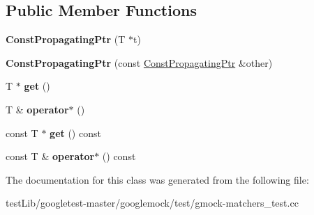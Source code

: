 \subsection*{Public Member Functions}
\begin{DoxyCompactItemize}
\item 
\mbox{\label{classtesting_1_1gmock__matchers__test_1_1ConstPropagatingPtr_a06da70663daa274fb8ca3352f039d609}} 
{\bfseries Const\+Propagating\+Ptr} (T $\ast$t)
\item 
\mbox{\label{classtesting_1_1gmock__matchers__test_1_1ConstPropagatingPtr_ae7620c62ba340603968896d5d5400ed1}} 
{\bfseries Const\+Propagating\+Ptr} (const \hyperlink{classtesting_1_1gmock__matchers__test_1_1ConstPropagatingPtr}{Const\+Propagating\+Ptr} \&other)
\item 
\mbox{\label{classtesting_1_1gmock__matchers__test_1_1ConstPropagatingPtr_a39a09d46453380ec1b8be8ce40adc453}} 
T $\ast$ {\bfseries get} ()
\item 
\mbox{\label{classtesting_1_1gmock__matchers__test_1_1ConstPropagatingPtr_ad77bbeaa18f84cbd6f3dc7021904f1e3}} 
T \& {\bfseries operator$\ast$} ()
\item 
\mbox{\label{classtesting_1_1gmock__matchers__test_1_1ConstPropagatingPtr_a92d7c8429246ef33a020e8a3d840b9c3}} 
const T $\ast$ {\bfseries get} () const
\item 
\mbox{\label{classtesting_1_1gmock__matchers__test_1_1ConstPropagatingPtr_aad99a528754294ab397378034686ae3a}} 
const T \& {\bfseries operator$\ast$} () const
\end{DoxyCompactItemize}


The documentation for this class was generated from the following file\+:\begin{DoxyCompactItemize}
\item 
test\+Lib/googletest-\/master/googlemock/test/gmock-\/matchers\+\_\+test.\+cc\end{DoxyCompactItemize}
